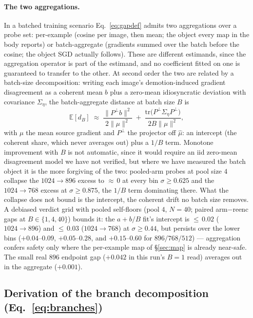 \paragraph{The two aggregations.}
In a batched training scenario Eq.~\ref{eq:gapdef} admits two
aggregations over a probe set: per-example (cosine per image, then
mean; the object every map in the body reports) or batch-aggregate
(gradients summed over the batch before the cosine; the object SGD
actually follows). These are different estimands, since the
aggregation operator is part of the estimand, and no coefficient
fitted on one is guaranteed to transfer to the other. At second order the two
are related by a batch-size decomposition: writing each image's
demotion-induced gradient disagreement as a coherent mean $b$ plus a
zero-mean idiosyncratic deviation with covariance $\Sigma_\eta$, the
batch-aggregate distance at batch size $B$ is
\begin{equation*}
\mathbb{E}[d_B] \;\approx\;
\frac{\|P^{\perp} b\|^2}{2\|\mu\|^2}
\;+\;
\frac{\mathrm{tr}\!\big(P^{\perp} \Sigma_\eta P^{\perp}\big)}{2B\|\mu\|^2},
\end{equation*}
with $\mu$ the mean source gradient and $P^{\perp}$ the projector off
$\hat\mu$: an intercept (the coherent share, which never averages
out) plus a $1/B$ term. Monotone improvement with $B$ is not
automatic, since it would require an iid zero-mean disagreement model
we have not verified, but where we have measured the batch object it
is the more forgiving of the two: pooled-arm probes at pool size $4$
collapse the $1024{\to}896$ excess to ${\approx}\,0$ at every bin
$\sigma \ge 0.625$ and the $1024{\to}768$ excess at
$\sigma \ge 0.875$, the $1/B$ term dominating
there. What the collapse does not bound is the intercept, the
coherent drift no batch size removes. A debiased verdict grid with
pooled self-floors (pool $4$, $N{=}40$; paired arm$-$reenc gaps at
$B \in \{1, 4, 40\}$) bounds it: the $a + b/B$ fit's intercept is
${\leq}\,0.02$ ($1024{\to}896$) and ${\leq}\,0.03$ ($1024{\to}768$)
at $\sigma \geq 0.44$, but persists over the lower bins
($+0.04$--$0.09$, $+0.05$--$0.28$, and $+0.15$--$0.60$ for
$896/768/512$) — aggregation confers safety only where the per-example
map of \S\ref{sec:map} is already near-safe. The small real $896$
endpoint gap ($+0.042$ in this run's $B{=}1$ read) averages out in the
aggregate ($+0.001$).

\subsection{Derivation of the branch decomposition
(Eq.~\ref{eq:branches})}
\label{app:branches}

